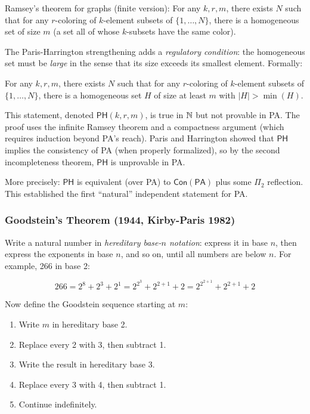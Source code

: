 Ramsey's theorem for graphs (finite version): For any $k, r, m$, there exists $N$ such that for any $r$-coloring of $k$-element subsets of $\{1, \dots, N\}$, there is a homogeneous set of size $m$ (a set all of whose $k$-subsets have the same color).

The Paris-Harrington strengthening adds a \emph{regulatory condition}: the homogeneous set must be \emph{large} in the sense that its size exceeds its smallest element. Formally:

\begin{theorem}
For any $k, r, m$, there exists $N$ such that for any $r$-coloring of $k$-element subsets of $\{1, \dots, N\}$, there is a homogeneous set $H$ of size at least $m$ with $|H| > \min(H)$.
\end{theorem}

This statement, denoted $\mathsf{PH}(k, r, m)$, is true in $\mathbb{N}$ but not provable in PA. The proof uses the infinite Ramsey theorem and a compactness argument (which requires induction beyond PA's reach). Paris and Harrington showed that $\mathsf{PH}$ implies the consistency of PA (when properly formalized), so by the second incompleteness theorem, $\mathsf{PH}$ is unprovable in PA.

More precisely: $\mathsf{PH}$ is equivalent (over PA) to $\mathsf{Con}(\mathsf{PA})$ plus some $\Pi_2$ reflection. This established the first ``natural'' independent statement for PA.

\subsubsection*{Goodstein's Theorem (1944, Kirby-Paris 1982)}

Write a natural number in \emph{hereditary base-$n$ notation}: express it in base $n$, then express the exponents in base $n$, and so on, until all numbers are below $n$. For example, 266 in base 2:

\[
266 = 2^8 + 2^3 + 2^1 = 2^{2^3} + 2^{2+1} + 2 = 2^{2^{2+1}} + 2^{2+1} + 2
\]

Now define the Goodstein sequence starting at $m$:
\begin{enumerate}
\item Write $m$ in hereditary base 2.
\item Replace every 2 with 3, then subtract 1.
\item Write the result in hereditary base 3.
\item Replace every 3 with 4, then subtract 1.
\item Continue indefinitely.
\end{enumerate}

